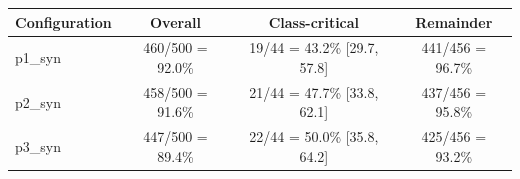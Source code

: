 \begin{center}
{\color{red}
\label{tab:class_critical}
\begin{tabular}{lccc}
\toprule
\textbf{Configuration} & \textbf{Overall} & \textbf{Class-critical} & \textbf{Remainder} \\
\midrule
p1\_syn & 460/500 = 92.0\% & 19/44 = 43.2\% [29.7, 57.8] & 441/456 = 96.7\% \\
p2\_syn & 458/500 = 91.6\% & 21/44 = 47.7\% [33.8, 62.1] & 437/456 = 95.8\% \\
p3\_syn & 447/500 = 89.4\% & 22/44 = 50.0\% [35.8, 64.2] & 425/456 = 93.2\% \\
\bottomrule
\end{tabular}
}
\end{center}